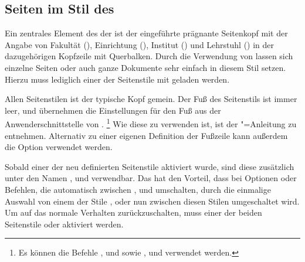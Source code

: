 \subsection{Seiten im Stil des \CDs}
\begin{Declaration}[v2.02]{}
\begin{Declaration}[v2.02]{}
\begin{Declaration}[v2.02]{}
\printdeclarationlist%
\label{sec:tudheadings}
%
Ein zentrales Element des \CDs der \TnUD ist der eingeführte prägnante 
Seitenkopf mit der Angabe von Fakultät (), Einrichtung 
(), Institut () und Lehrstuhl 
() in der dazugehörigen Kopfzeile mit Querbalken. Durch die 
Verwendung von  lassen sich einzelne Seiten oder auch 
ganze Dokumente sehr einfach in diesem Stil setzen. Hierzu muss lediglich einer 
der Seitenstile mit  geladen werden. 

Allen Seitenstilen ist der typische Kopf gemein. Der Fuß des Seitenstils 
 ist immer leer,  und 
 übernehmen die Einstellungen für den Fuß aus der 
Anwenderschnittstelle von .%
\footnote{%
  Es können die Befehle ,  und  sowie 
  ,  und  verwendet werden.
}
Wie diese zu verwenden ist, ist der \KOMAScript"=Anleitung zu entnehmen. 
Alternativ zu einer eigenen Definition der Fußzeile kann außerdem die Option 
 verwendet werden.

Sobald einer der neu definierten Seitenstile aktiviert wurde, sind diese 
zusätzlich unter den Namen ,  und 
 verwendbar. Das hat den Vorteil, dass bei Optionen oder 
Befehlen, die automatisch zwischen ,  
und  umschalten, durch die einmalige Auswahl von einem der 
Stile ,  oder 
 nun zwischen diesen Stilen umgeschaltet wird. Um 
auf das normale Verhalten zurückzuschalten, muss einer der beiden Seitenstile 
 oder  aktiviert werden.
\end{Declaration}
\end{Declaration}
\end{Declaration}

